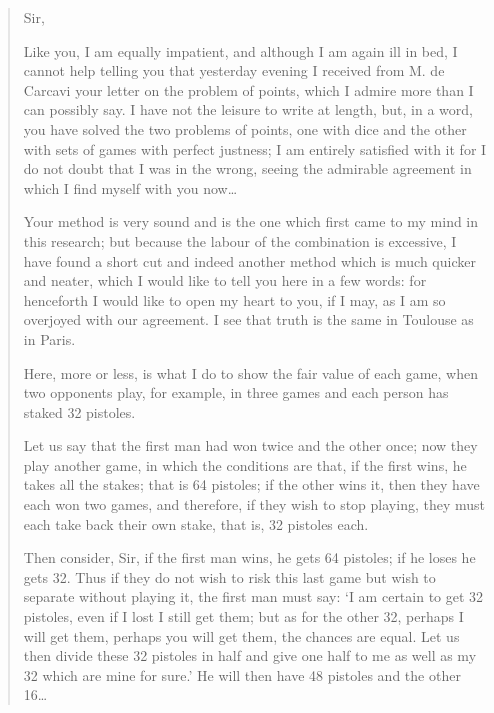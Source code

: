 \begin{quote}
Sir,
\par
Like you, I am equally impatient, and although I am again ill in bed, I
cannot help telling you that yesterday evening I received from M. de Carcavi
your letter on the problem of points, which I admire more than I can possibly
say.  I have not the leisure to write at length, but, in a word, you have
solved the two problems of points, one with dice and the other with sets of
games with perfect justness; I am entirely satisfied with it for I do not doubt
that I was in the wrong, seeing the admirable agreement in which I find myself
with you now\dots
\par
Your method is very sound and is the one which first came to my mind in this
research; but because the labour of the combination is excessive, I have found
a short cut and indeed another method which is much quicker and neater, which I
would like to tell you here in a few words: for henceforth I would like to open
my heart to you, if I may, as I am so overjoyed with our agreement.  I see that
truth is the same in Toulouse as in Paris.
\par
Here, more or less, is what I do to show the fair value of each game, when two
opponents play, for example, in three games and each person has staked 32
pistoles.
\par
Let us say that the first man had won twice and the other once; now they play
another game, in which the conditions are that, if the first wins, he takes all
the stakes; that is 64 pistoles; if the other wins it, then they have each won
two games, and therefore, if they wish to stop playing, they must each take
back their own stake, that is, 32 pistoles each.
\par
Then consider, Sir, if the first man wins, he gets 64 pistoles; if he loses he
gets 32.  Thus if they do not wish to risk this last game but wish to separate
without playing it, the first man must say: `I am certain to get 32 pistoles,
even if I lost I still get them; but as for the other 32, perhaps I will get
them, perhaps you will get them, the chances are equal.  Let us then divide
these 32 pistoles in half and give one half to me as well as my 32 which are
mine for sure.'  He will then have 48 pistoles and the other 16\dots
\end{quote}

